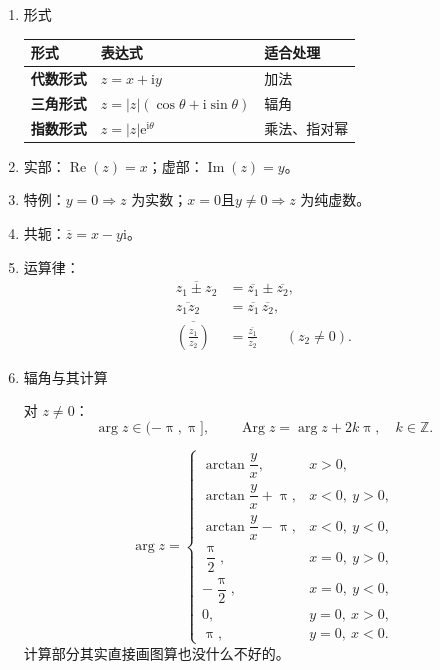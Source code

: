\documentclass[UTF8,fontset=fandol,zihao=5]{ctexart}
\newcommand{\ii}{\mathrm{i}}
\newcommand{\ee}{\mathrm{e}}
\begin{document}
\begin{enumerate}
  \item 形式
  \begin{center}
    \begin{tabularx}{0.92\textwidth}{>{\bfseries}p{2.5cm}X X}
      \toprule
      形式 & 表达式 & 适合处理 \\
      \midrule
      代数形式 & \(z=x+\ii y\) & 加法 \\
      三角形式 & \(z=|z|(\cos\theta+\ii\sin\theta)\) & 辐角 \\
      指数形式 & \(z=|z|\ee^{\ii\theta}\) & 乘法、指对幂 \\
      \bottomrule
    \end{tabularx}
  \end{center}
  \item 实部：\(\operatorname{Re}\left ( z \right ) = x\)；虚部：\(\operatorname{Im}\left ( z \right ) = y\)。
  \item 特例：\(y=0\Rightarrow z\) 为实数；$x=0$且$y\neq0\Rightarrow z$ 为纯虚数。
  \item 共轭：\(\overline z=x-y\ii\)。
  \item 运算律：
    \[
      \begin{aligned}
        \overline{z_1\pm z_2}&=\overline{z_1}\pm\overline{z_2},\\
        \overline{z_1z_2}&=\overline{z_1}\,\overline{z_2},\\
        \overline{\left(\frac{z_1}{z_2}\right)}
          &=\frac{\overline{z_1}}{\overline{z_2}}\qquad(z_2\neq0).
      \end{aligned}
    \]
  \item 辐角与其计算

    对 \(z\neq0\)：
    \[
      \arg z\in(-\uppi,\uppi],
      \qquad
      \operatorname{Arg}z=\arg z+2k\uppi,
      \quad k\in\mathbb Z.
    \]

    \[
    \arg z=
    \begin{cases}
      \arctan\dfrac{y}{x}, & x>0,\\[4pt]
      \arctan\dfrac{y}{x}+\uppi, & x<0,\ y>0,\\[4pt]
      \arctan\dfrac{y}{x}-\uppi, & x<0,\ y<0,\\[4pt]
      \dfrac{\uppi}{2}, & x=0,\ y>0,\\[4pt]
      -\dfrac{\uppi}{2}, & x=0,\ y<0,\\[4pt]
      0, & y=0,\ x>0,\\[4pt]
      \uppi, & y=0,\ x<0.
    \end{cases}
    \]
    计算部分其实直接画图算也没什么不好的。
\end{enumerate}
\end{document}
